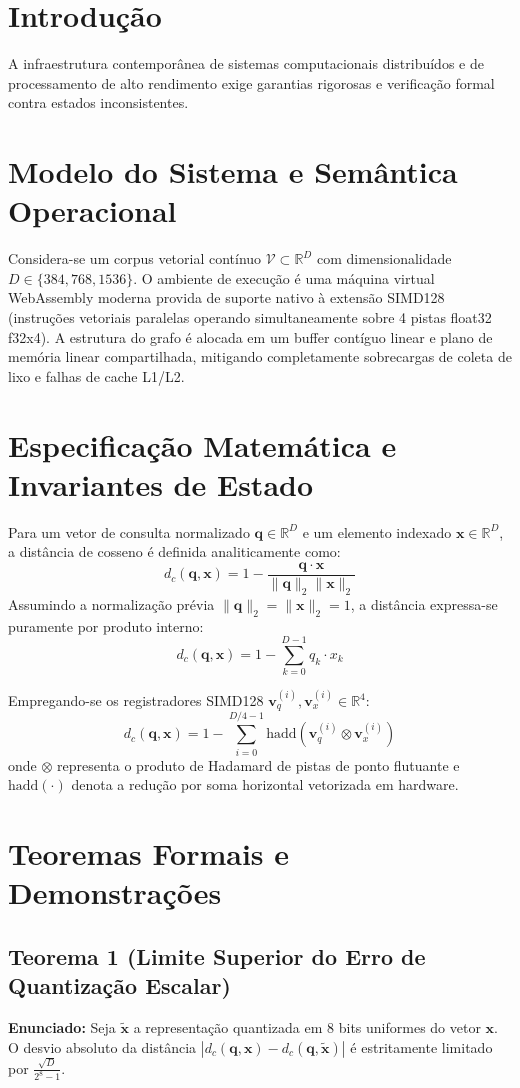 \documentclass[
  article,
  12pt,
  oneside,
  a4paper,
  english,
  brazil
]{abntex2}
\begin{document}
\section{Introdução}
A infraestrutura contemporânea de sistemas computacionais distribuídos e de processamento de alto rendimento exige garantias rigorosas e verificação formal contra estados inconsistentes.

\section{Modelo do Sistema e Semântica Operacional}
Considera-se um corpus vetorial contínuo $\mathcal{V} \subset \mathbb{R}^D$ com dimensionalidade $D \in \{384, 768, 1536\}$. O ambiente de execução é uma máquina virtual WebAssembly moderna provida de suporte nativo à extensão SIMD128 (instruções vetoriais paralelas operando simultaneamente sobre 4 pistas float32 f32x4). A estrutura do grafo é alocada em um buffer contíguo linear e plano de memória linear compartilhada, mitigando completamente sobrecargas de coleta de lixo e falhas de cache L1/L2.

\section{Especificação Matemática e Invariantes de Estado}
Para um vetor de consulta normalizado $\mathbf{q} \in \mathbb{R}^D$ e um elemento indexado $\mathbf{x} \in \mathbb{R}^D$, a distância de cosseno é definida analiticamente como:
$$d_c(\mathbf{q}, \mathbf{x}) = 1 - \frac{\mathbf{q} \cdot \mathbf{x}}{\|\mathbf{q}\|_2 \|\mathbf{x}\|_2}$$
Assumindo a normalização prévia $\|\mathbf{q}\|_2 = \|\mathbf{x}\|_2 = 1$, a distância expressa-se puramente por produto interno:
$$d_c(\mathbf{q}, \mathbf{x}) = 1 - \sum_{k=0}^{D-1} q_k \cdot x_k$$

Empregando-se os registradores SIMD128 $\mathbf{v}_q^{(i)}, \mathbf{v}_x^{(i)} \in \mathbb{R}^4$:
$$d_c(\mathbf{q}, \mathbf{x}) = 1 - \sum_{i=0}^{D/4 - 1} \text{hadd}\left( \mathbf{v}_q^{(i)} \otimes \mathbf{v}_x^{(i)} \right)$$
onde $\otimes$ representa o produto de Hadamard de pistas de ponto flutuante e $\text{hadd}(\cdot)$ denota a redução por soma horizontal vetorizada em hardware.

\section{Teoremas Formais e Demonstrações}
\subsection{Teorema 1 (Limite Superior do Erro de Quantização Escalar)}
\textbf{Enunciado:} Seja $\tilde{\mathbf{x}}$ a representação quantizada em 8 bits uniformes do vetor $\mathbf{x}$. O desvio absoluto da distância $|d_c(\mathbf{q}, \mathbf{x}) - d_c(\mathbf{q}, \tilde{\mathbf{x}})|$ é estritamente limitado por $\frac{\sqrt{D}}{2^8 - 1}$.
\end{document}
